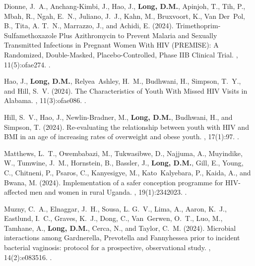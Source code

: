 \begin{thebibliography}{}
Dionne, J.~A., Anchang-Kimbi, J., Hao, J., \textbf{Long, D.M.}, Apinjoh, T., Tih, P.,
  Mbah, R., Ngah, E.~N., Juliano, J.~J., Kahn, M., Bruxvoort, K., Van Der~Pol,
  B., Tita, A. T.~N., Marrazzo, J., and Achidi, E. (2024).
\newblock Trimethoprim-{Sulfamethoxazole} {Plus} {Azithromycin} to {Prevent}
  {Malaria} and {Sexually} {Transmitted} {Infections} in {Pregnant} {Women}
  {With} {HIV} ({PREMISE}): {A} {Randomized}, {Double}-{Masked},
  {Placebo}-{Controlled}, {Phase} {IIB} {Clinical} {Trial}.
, 11(5):ofae274.
.  



Hao, J., \textbf{Long, D.M.}, Relyea~Ashley, H.~M., Budhwani, H., Simpson, T.~Y., and
  Hill, S.~V. (2024).
\newblock The {Characteristics} of {Youth} {With} {Missed} {HIV} {Visits} in
  {Alabama}.
, 11(3):ofae086.
.  



Hill, S.~V., Hao, J., Newlin-Bradner, M., \textbf{Long, D.M.}, Budhwani, H., and
  Simpson, T. (2024).
\newblock Re-evaluating the relationship between youth with {HIV} and {BMI} in
  an age of increasing rates of overweight and obese youth.
, 17(1):97.
.  



Matthews, L.~T., Owembabazi, M., Tukwasibwe, D., Najjuma, A., Muyindike, W.,
  Tumwine, J.~M., Hornstein, B., Bassler, J., \textbf{Long, D.M.}, Gill, E., Young, C.,
  Chitneni, P., Psaros, C., Kanyesigye, M., Kato~Kalyebara, P., Kaida, A., and
  Bwana, M. (2024).
\newblock Implementation of a safer conception programme for {HIV}-affected men
  and women in rural {Uganda}.
, 19(1):2342023.
.   




Muzny, C.~A., Elnaggar, J.~H., Sousa, L. G.~V., Lima, A., Aaron, K.~J.,
  Eastlund, I.~C., Graves, K.~J., Dong, C., Van~Gerwen, O.~T., Luo, M.,
  Tamhane, A., \textbf{Long, D.M.}, Cerca, N., and Taylor, C.~M. (2024).
\newblock Microbial interactions among {Gardnerella}, {Prevotella} and
  {Fannyhessea} prior to incident bacterial vaginosis: protocol for a
  prospective, observational study.
, 14(2):e083516.
.  




\end{thebibliography}
